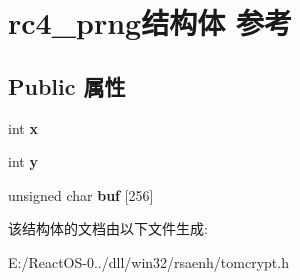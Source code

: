 \hypertarget{structrc4__prng}{}\section{rc4\+\_\+prng结构体 参考}
\label{structrc4__prng}
\subsection*{Public 属性}
\begin{DoxyCompactItemize}
\item 
\mbox{\label{structrc4__prng_a5e3ef9b159b90c8e384a14507ea05d9d}} 
int {\bfseries x}
\item 
\mbox{\label{structrc4__prng_ad96614d1d45a805b8f9dbe1258eaa872}} 
int {\bfseries y}
\item 
\mbox{\label{structrc4__prng_ae6baf549b17e4df3c38a2721cf1c60d4}} 
unsigned char {\bfseries buf} \mbox{[}256\mbox{]}
\end{DoxyCompactItemize}


该结构体的文档由以下文件生成\+:\begin{DoxyCompactItemize}
\item 
E\+:/\+React\+O\+S-\/0../dll/win32/rsaenh/tomcrypt.\+h\end{DoxyCompactItemize}
